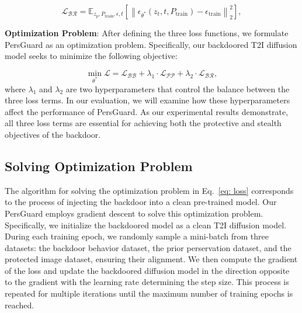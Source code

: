 \begin{equation}
   \mathcal{L_{BR}} = \mathbb{E}_{z_p, P_{\text{train}}, \epsilon, t}\left[\left\|\epsilon_{\theta^{*}}\left(z_{t}, t, P_{\text{train}}\right)-\epsilon_{\text{train}}\right\|_2^2\right],
   \label{eq: br}
\end{equation}



\noindent \textbf{Optimization Problem}: After defining the three loss functions, we formulate PersGuard as an optimization problem. Specifically, our backdoored T2I diffusion model seeks to minimize the following objective:

\begin{equation}
   \min_{\theta^{*}} \mathcal{L} = \mathcal{L_{BB}} + \lambda_1 \cdot \mathcal{L_{PP}} +\lambda_2 \cdot \mathcal{L_{BR}},
   \label{eq: loss}
\end{equation}
where $\lambda_1$ and $\lambda_2$ are two hyperparameters that control the balance between the three loss terms. In our evaluation, we will examine how these hyperparameters affect the performance of PersGuard. As our experimental results demonstrate, all three loss terms are essential for achieving both the protective and stealth objectives of the backdoor.


\subsection{Solving Optimization Problem}
The algorithm for solving the optimization problem in Eq.~\eqref{eq: loss} corresponds to the process of injecting the backdoor into a clean pre-trained model. Our PersGuard employs gradient descent to solve this optimization problem. Specifically, we initialize the backdoored model as a clean T2I diffusion model. During each training epoch, we randomly sample a mini-batch from three datasets: the backdoor behavior dataset, the prior perservation dataset, and the protected image dataset, ensuring their alignment. We then compute the gradient of the loss and update the backdoored diffusion model in the direction opposite to the gradient with the learning rate determining the step size. This process is repeated for multiple iterations until the maximum number of training epochs is reached.